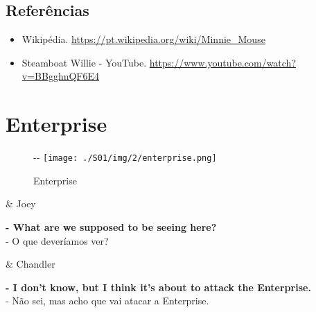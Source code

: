 \hypertarget{referuxeancias-4}{%
\subsection{Referências}\label{referuxeancias-4}}

\begin{itemize}
\tightlist
\item
  \sloppy Wikipédia. \url{https://pt.wikipedia.org/wiki/Minnie_Mouse}
\item
  \sloppy Steamboat Willie - YouTube. \url{https://www.youtube.com/watch?v=BBgghnQF6E4}
\end{itemize}

\hypertarget{enterprise}{%
\section{Enterprise}\label{enterprise}}

\begin{figure}[!ht]
  \begin{adjustwidth}{-\oddsidemargin-1in}{-\rightmargin}
    \centering
    \texttt{[image: ./S01/img/2/enterprise.png]}
    \caption{Enterprise\label{fig:enterprise}}
  \end{adjustwidth}
\end{figure}

\begin{tcolorbox}[enhanced,center upper,
    drop fuzzy shadow southeast, boxrule=0.3pt,
    lower separated=false,
    colframe=black!30!dialogoBorder,colback=white]
\begin{minipage}[c]{0.14\linewidth}
   & \centering \scriptsize{Joey}
\end{minipage}
\hspace{.1mm}
\begin{minipage}[c]{0.8\linewidth}
  \textbf{- What are we supposed to be seeing here?}\\
  - O que deveríamos ver?
\end{minipage}

\medskip
\begin{minipage}[c]{0.14\linewidth}
   & \centering \scriptsize{Chandler}
\end{minipage}
\hspace{.1mm}
\begin{minipage}[c]{0.8\linewidth}
  \textbf{- I don't know, but I think it's about to attack the Enterprise.}\\
  - Não sei, mas acho que vai atacar a Enterprise.
\end{minipage}
\end{tcolorbox}

